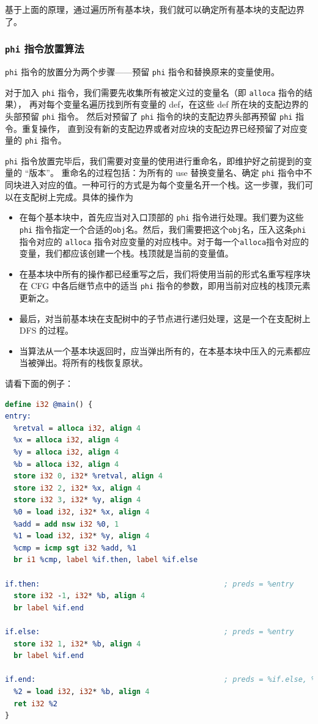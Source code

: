 基于上面的原理，通过遍历所有基本块，我们就可以确定所有基本块的支配边界了。

\subsubsection{\texttt{phi} 指令放置算法}

\texttt{phi} 指令的放置分为两个步骤——预留 \texttt{phi} 指令和替换原来的变量使用。

对于加入 \texttt{phi} 指令，我们需要先收集所有被定义过的变量名（即 \texttt{alloca} 指令的结果），
再对每个变量名遍历找到所有变量的 def，在这些 def 所在块的支配边界的头部预留 \texttt{phi} 指令。
然后对预留了 \texttt{phi} 指令的块的支配边界头部再预留 \texttt{phi} 指令。重复操作，
直到没有新的支配边界或者对应块的支配边界已经预留了对应变量的 \texttt{phi} 指令。

\texttt{phi} 指令放置完毕后，我们需要对变量的使用进行重命名，即维护好之前提到的变量的 “版本”。
重命名的过程包括：为所有的 use 替换变量名、确定 \texttt{phi} 指令中不同块进入对应的值。一种可行的方式是为每个变量名开一个栈。这一步骤，我们可以在支配树上完成。具体的操作为
\begin{itemize}
  \item 在每个基本块中，首先应当对入口顶部的 \texttt{phi} 指令进行处理。我们要为这些\texttt{phi} 指令指定一个合适的\texttt{obj}名。然后，我们需要把这个\texttt{obj}名，压入这条\texttt{phi} 指令对应的 \texttt{alloca} 指令对应变量的对应栈中。对于每一个\texttt{alloca}指令对应的变量，我们都应该创建一个栈。栈顶就是当前的变量值。
  \item 在基本块中所有的操作都已经重写之后，我们将使用当前的形式名重写程序块在 CFG 中各后继节点中的适当 \texttt{phi} 指令的参数，即用当前对应栈的栈顶元素更新之。
  \item 最后，对当前基本块在支配树中的子节点进行递归处理，这是一个在支配树上 DFS 的过程。
  \item 当算法从一个基本块返回时，应当弹出所有的，在本基本块中压入的元素都应当被弹出。将所有的栈恢复原状。
\end{itemize}

请看下面的例子：

\begin{lstlisting}[language=LLVM]
define i32 @main() {
entry:
  %retval = alloca i32, align 4
  %x = alloca i32, align 4
  %y = alloca i32, align 4
  %b = alloca i32, align 4
  store i32 0, i32* %retval, align 4
  store i32 2, i32* %x, align 4
  store i32 3, i32* %y, align 4
  %0 = load i32, i32* %x, align 4
  %add = add nsw i32 %0, 1
  %1 = load i32, i32* %y, align 4
  %cmp = icmp sgt i32 %add, %1
  br i1 %cmp, label %if.then, label %if.else

if.then:                                          ; preds = %entry
  store i32 -1, i32* %b, align 4
  br label %if.end

if.else:                                          ; preds = %entry
  store i32 1, i32* %b, align 4
  br label %if.end

if.end:                                           ; preds = %if.else, %if.then
  %2 = load i32, i32* %b, align 4
  ret i32 %2
}
\end{lstlisting}

